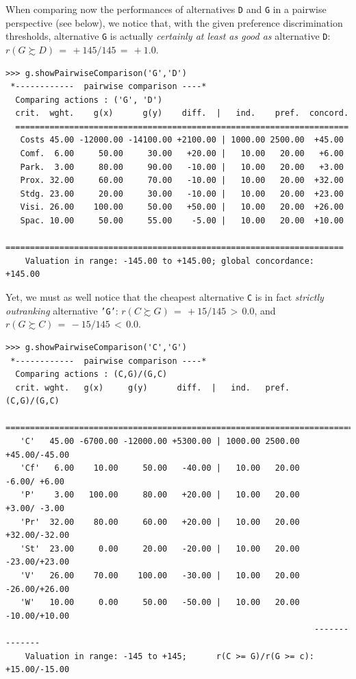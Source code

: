 When comparing now the performances of alternatives \texttt{D} and \texttt{G} in a pairwise perspective (see below), we notice that, with the given preference discrimination thresholds, alternative \texttt{G} is actually \emph{certainly at least as good as} alternative \texttt{D}:  $r(G \succsim D)\, = \, +145/145\, =\, +1.0$.
\begin{lstlisting}[caption={Inspecting pairwise comparisons},label=list:4.5,basicstyle=\ttfamily\scriptsize]
>>> g.showPairwiseComparison('G','D')
 *------------  pairwise comparison ----*
  Comparing actions : ('G', 'D')
  crit.  wght.    g(x)      g(y)    diff.  |   ind.    pref.  concord. 
  ====================================================================
   Costs 45.00 -12000.00 -14100.00 +2100.00 | 1000.00 2500.00  +45.00  
   Comf.  6.00     50.00     30.00   +20.00 |   10.00   20.00   +6.00 
   Park.  3.00     80.00     90.00   -10.00 |   10.00   20.00   +3.00 
   Prox. 32.00     60.00     70.00   -10.00 |   10.00   20.00  +32.00 
   Stdg. 23.00     20.00     30.00   -10.00 |   10.00   20.00  +23.00 
   Visi. 26.00    100.00     50.00   +50.00 |   10.00   20.00  +26.00 
   Spac. 10.00     50.00     55.00    -5.00 |   10.00   20.00  +10.00
   =====================================================================
    Valuation in range: -145.00 to +145.00; global concordance: +145.00
\end{lstlisting}

Yet, we must as well notice that the cheapest alternative \texttt{C} is in fact \emph{strictly outranking} alternative \texttt{'G'}:  $r(C \succsim G)\, =\, +15/145\, >\, 0.0$, and $r(G \succsim C)\, =\, -15/145 \,<\, 0.0$.
\begin{lstlisting}[basicstyle=\ttfamily\scriptsize]
>>> g.showPairwiseComparison('C','G')
 *------------  pairwise comparison ----*
  Comparing actions : (C,G)/(G,C)
  crit. wght.   g(x)     g(y)      diff.  |   ind.   pref.       (C,G)/(G,C)
   ==========================================================================
   'C'   45.00 -6700.00 -12000.00 +5300.00 | 1000.00 2500.00    +45.00/-45.00 
   'Cf'   6.00    10.00     50.00   -40.00 |   10.00   20.00     -6.00/ +6.00 
   'P'    3.00   100.00     80.00   +20.00 |   10.00   20.00     +3.00/ -3.00 
   'Pr'  32.00    80.00     60.00   +20.00 |   10.00   20.00    +32.00/-32.00 
   'St'  23.00     0.00     20.00   -20.00 |   10.00   20.00    -23.00/+23.00 
   'V'   26.00    70.00    100.00   -30.00 |   10.00   20.00    -26.00/+26.00 
   'W'   10.00     0.00     50.00   -50.00 |   10.00   20.00    -10.00/+10.00
                                                               --------------
    Valuation in range: -145 to +145;      r(C >= G)/r(G >= c): +15.00/-15.00
\end{lstlisting}

